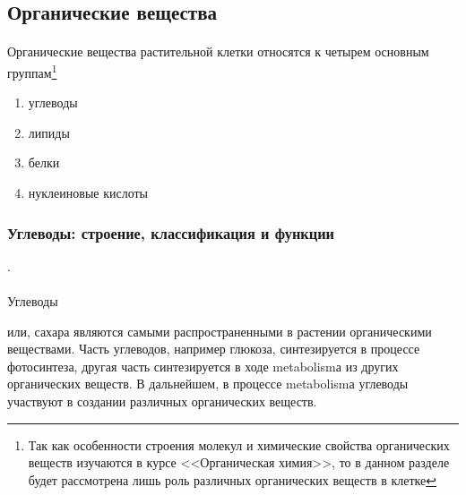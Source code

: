 

\subsection*{Органические вещества}

\paragraph*{}Органические вещества растительной клетки относятся к четырем основным группам\footnote{Так как особенности строения молекул и химические свойства органических веществ изучаются в курсе <<Органическая химия>>, то в данном разделе будет рассмотрена лишь роль различных органических веществ в клетке}

\begin{enumerate}

	\item углеводы
	\item липиды
	\item белки
	\item нуклеиновые кислоты

\end{enumerate}

\subsubsection*{Углеводы: строение, классификация и функции}.

\paragraph*{}\hypertarget{sect_glycosids}{Углеводы} или, сахара являются самыми распространенными в растении органическими веществами. Часть углеводов, например глюкоза, синтезируется в процессе фотосинтеза, другая часть синтезируется в ходе \gls{metabolism}а из других органических веществ. В дальнейшем, в процессе \gls{metabolism}а углеводы участвуют в создании различных органических веществ.

